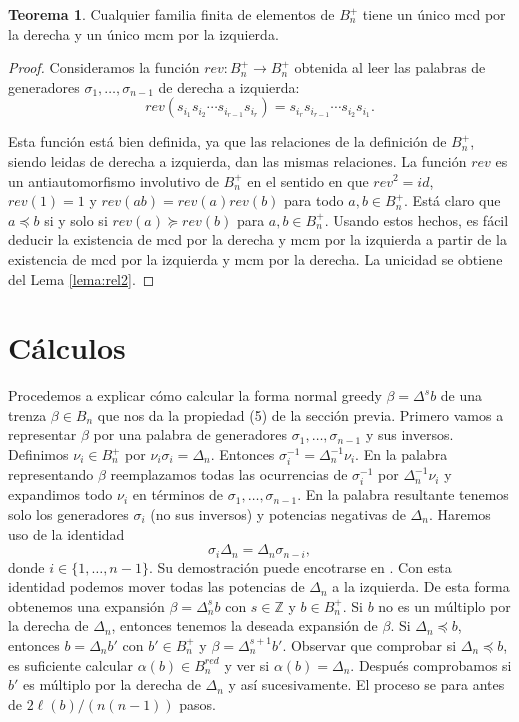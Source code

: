 \documentclass[12pt]{book}
\theoremstyle{definition}
\newtheorem{teor}{Teorema}[section]
\begin{document}
\begin{teor}
Cualquier familia finita de elementos de $B_n^+$ tiene un único mcd por la derecha y un único mcm por la izquierda.
\end{teor}
\begin{proof} Consideramos la función $rev: B_n^+\rightarrow B_n^+$ obtenida al leer las palabras de generadores $\sigma_1,\ldots, \sigma_{n-1}$ de derecha a izquierda:
$$rev(s_{i_1}s_{i_2}\cdots s_{i_{r-1}}s_{i_r})=s_{i_r}s_{i_{r-1}}\cdots s_{i_{2}}s_{i_1}.$$

Esta función está bien definida, ya que las relaciones de la definición de $B_n^+$, siendo leidas de derecha a izquierda, dan las mismas relaciones. La función $rev$ es un antiautomorfismo involutivo de $B_n^+$ en el sentido en que $rev^2=id$, $rev(1)=1$ y $rev(ab)=rev(a)rev(b)$ para todo $a,b\in B_n^+$. Está claro que $a\preceq b$ si y solo si $rev(a)\succeq rev(b)$ para $a,b\in B_n^+$. Usando estos hechos, es fácil deducir la existencia de mcd por la derecha y mcm por la izquierda a partir de la existencia de mcd por la izquierda y mcm por la derecha. La unicidad se obtiene del Lema \ref{lema:rel2}.
\end{proof}

\section{Cálculos}

Procedemos a explicar cómo calcular la forma normal greedy $\beta=\Delta^sb$ de una trenza $\beta\in B_n$ que nos da la propiedad (5) de la sección previa. Primero vamos a representar $\beta$ por una palabra de generadores $\sigma_1,\ldots,\sigma_{n-1}$ y sus inversos. Definimos $\nu_i\in B_n^+$ por $\nu_i\sigma_i=\Delta_n$. Entonces $\sigma_i^{-1}=\Delta_n^{-1}\nu_i$. En la palabra representando $\beta$ reemplazamos todas las ocurrencias de $\sigma_i^{-1}$ por $\Delta_n^{-1}\nu_i$ y expandimos todo $\nu_i$ en términos de $\sigma_1,\ldots,\sigma_{n-1}$. En la palabra resultante tenemos solo los generadores $\sigma_i$ (no sus inversos) y potencias negativas de $\Delta_n$. Haremos uso de la identidad
\begin{equation}
\sigma_i\Delta_n=\Delta_n\sigma_{n-i},
\end{equation}
donde $i\in\{1,\ldots,n-1\}$. Su demostración puede encotrarse en \cite{br_gr}. Con esta identidad podemos mover todas las potencias de $\Delta_n$ a la izquierda. De esta forma obtenemos una expansión $\beta=\Delta_n^sb$ con $s\in\mathbb{Z}$ y $b\in B_n^+$. Si $b$ no es un múltiplo por la derecha de $\Delta_n$, entonces tenemos la deseada expansión de $\beta$. Si $\Delta_n\preceq b$, entonces $b=\Delta_n b'$ con $b'\in B_n^+$ y $\beta=\Delta_n^{s+1}b'$. Observar que comprobar si $\Delta_n\preceq b$, es suficiente calcular $\alpha(b)\in B_n^{red}$ y ver si $\alpha(b)=\Delta_n$. Después comprobamos si $b'$ es múltiplo por la derecha de $\Delta_n$ y así sucesivamente. El proceso se para antes de $2\ell(b)/(n(n-1))$ pasos.
\end{document}
